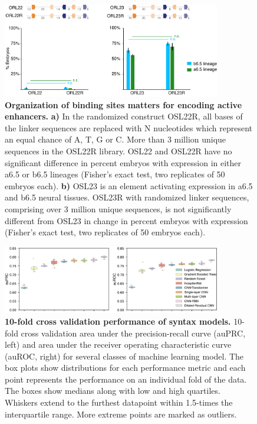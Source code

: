 \begin{figure}[p]
    \centering
    \includegraphics[width=0.85\textwidth]{2_figures-and-files/SuppFig5.png}
    \caption[Organization of binding sites matters for encoding active enhancers.]{\textbf{Organization of binding sites matters for encoding active enhancers.} \textbf{a)} In the randomized construct OSL22R, all bases of the linker sequences are replaced with N nucleotides which represent an equal chance of A, T, G or C. More than 3 million unique sequences in the OSL22R library. OSL22 and OSL22R have no significant difference in percent embryos with expression in either a6.5 or b6.5 lineages (Fisher’s exact test, two replicates of 50 embryos each). \textbf{b)} OSL23 is an element activating expression in a6.5 and b6.5 neural tissues. OSL23R with randomized linker sequences, comprising over 3 million unique sequences, is not significantly different from OSL23 in change in percent embryos with expression (Fisher’s exact test, two replicates of 50 embryos each).}
    \label{fig:2 supplementary_5}
\end{figure}

\begin{figure}[p]
    \centering
    \includegraphics[width=0.85\textwidth]{2_figures-and-files/SuppFig6.png}
    \caption[10-fold cross validation performance of syntax models.]{\textbf{10-fold cross validation performance of syntax models.} 10-fold cross validation area under the precision-recall curve (auPRC, left) and area under the receiver operating characteristic curve (auROC, right) for several classes of machine learning model. The box plots show distributions for each performance metric and each point represents the performance on an individual fold of the data. The boxes show medians along with low and high quartiles. Whiskers extend to the furthest datapoint within 1.5-times the interquartile range. More extreme points are marked as outliers.}
    \label{fig:2 supplementary_6}
\end{figure}

